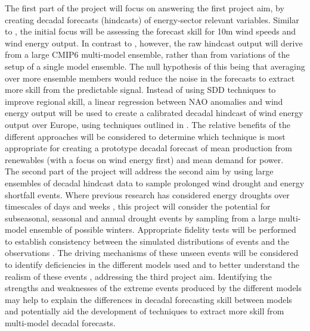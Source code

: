 \documentclass{article}
\begin{document}
The first part of the project will focus on answering the first project aim, by creating decadal forecasts (hindcasts) of energy-sector relevant variables. Similar to \cite{moemken2016decadal}, the initial focus will be assessing the forecast skill for 10m wind speeds and wind energy output. In contrast to \cite{moemken2016decadal}, however, the raw hindcast output will derive from a large CMIP6 multi-model ensemble, rather than from variations of the setup of a single model ensemble. The null hypothesis of this being that averaging over more ensemble members would reduce the noise in the forecasts to extract more skill from the predictable signal. Instead of using SDD techniques to improve regional skill, a linear regression between NAO anomalies and wind energy output will be used to create a calibrated decadal hindcast of wind energy output over Europe, using techniques outlined in \cite{bett2022simplified,dunstone2022towards}. The relative benefits of the different approaches will be considered to determine which technique is most appropriate for creating a prototype decadal forecast of mean production from renewables (with a focus on wind energy first) and mean demand for power.\\

The second part of the project will address the second aim by using large ensembles of decadal hindcast data to sample prolonged wind drought and energy shortfall events. Where previous research has considered energy droughts over timescales of days \parencite{van2019meteorological} and weeks \parencite{kay2023variability}, this project will consider the potential for subseasonal, seasonal and annual drought events by sampling from a large multi-model ensemble of possible winters. Appropriate fidelity tests will be performed to establish consistency between the simulated distributions of events and the observations \parencite{kelder2022interpreting}. The driving mechanisms of these unseen events will be considered to identify deficiencies in the different models used and to better understand the realism of these events \parencite{kelder2022interpreting}, addressing the third project aim. Identifying the strengths and weaknesses of the extreme events produced by the different models may help to explain the differences in decadal forecasting skill between models and potentially aid the development of techniques to extract more skill from multi-model decadal forecasts.\\
\end{document}
